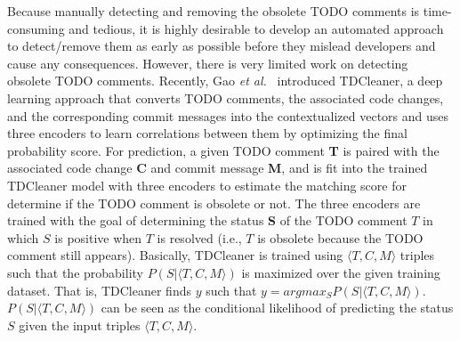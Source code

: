 Because manually detecting and removing the obsolete TODO comments is
time-consuming and tedious, it is highly desirable to develop an
automated approach to detect/remove them as early as possible before
they mislead developers and cause any consequences. However, there is
very limited work on detecting obsolete TODO comments. Recently, Gao
{\em et al.}~\cite{tdcleaner-fse21} introduced TDCleaner, a deep
learning approach that converts TODO comments, the associated code
changes, and the corresponding commit messages into the contextualized
vectors and uses three encoders to learn correlations between them by
optimizing the final probability score. For prediction, a given TODO
comment {\bf T} is paired with the associated code change {\bf C}
and commit message {\bf M}, and is fit into the trained TDCleaner
model with three encoders to estimate the matching score for determine
if the TODO comment is obsolete or not. The three encoders are trained
with the goal of determining the status {\bf S} of the TODO comment
$T$ in which $S$ is positive when $T$ is resolved (i.e., $T$ is
obsolete because the TODO comment still appears). Basically, TDCleaner
is trained using $\langle T, C, M \rangle$ triples such that the probability $P(S |
\langle T, C, M \rangle)$ is maximized over the given training dataset. That is,
TDCleaner finds $y$ such that $y = argmax_S P (S | \langle T, C, M \rangle)$. $P(S |
\langle T, C, M \rangle)$ can be seen as the conditional likelihood of predicting
the status $S$ given the input triples $\langle T, C, M \rangle$.


